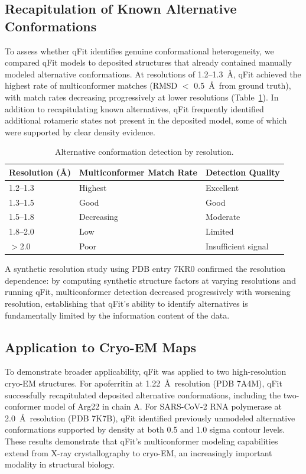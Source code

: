 \documentclass[12pt]{article}
\begin{document}
\subsection{Recapitulation of Known Alternative Conformations}

To assess whether qFit identifies genuine conformational heterogeneity, we compared qFit models to deposited structures that already contained manually modeled alternative conformations. At resolutions of 1.2--1.3~\AA, qFit achieved the highest rate of multiconformer matches (RMSD $<$ 0.5~\AA~from ground truth), with match rates decreasing progressively at lower resolutions (Table~\ref{tab:resolution}). In addition to recapitulating known alternatives, qFit frequently identified additional rotameric states not present in the deposited model, some of which were supported by clear density evidence.

\begin{table}[ht]
\centering
\caption{Alternative conformation detection by resolution.}
\label{tab:resolution}
\begin{tabular}{lll}
\toprule
Resolution (\AA) & Multiconformer Match Rate & Detection Quality \\
\midrule
1.2--1.3 & Highest & Excellent \\
1.3--1.5 & Good & Good \\
1.5--1.8 & Decreasing & Moderate \\
1.8--2.0 & Low & Limited \\
$>$2.0 & Poor & Insufficient signal \\
\bottomrule
\end{tabular}
\end{table}

A synthetic resolution study using PDB entry 7KR0 confirmed the resolution dependence: by computing synthetic structure factors at varying resolutions and running qFit, multiconformer detection decreased progressively with worsening resolution, establishing that qFit's ability to identify alternatives is fundamentally limited by the information content of the data.

\subsection{Application to Cryo-EM Maps}

To demonstrate broader applicability, qFit was applied to two high-resolution cryo-EM structures. For apoferritin at 1.22~\AA~resolution (PDB 7A4M), qFit successfully recapitulated deposited alternative conformations, including the two-conformer model of Arg22 in chain A. For SARS-CoV-2 RNA polymerase at 2.0~\AA~resolution (PDB 7K7B), qFit identified previously unmodeled alternative conformations supported by density at both 0.5 and 1.0 sigma contour levels. These results demonstrate that qFit's multiconformer modeling capabilities extend from X-ray crystallography to cryo-EM, an increasingly important modality in structural biology.
\end{document}
